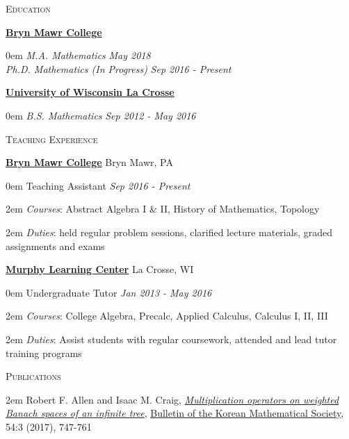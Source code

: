 \documentclass[11pt]{article}
\newenvironment{headitem}[2]{\vskip5pt \hspace{.5em} \textbf{#1} \hfill #2 \begin{addmargin}[0em]{0em}}{\end{addmargin}}
\renewenvironment{section}[1]{\textsc{\large #1}}{\vskip10pt}
\newcommand{\itemreg}[1]{\begin{addmargin}[.75em]{2em} #1 \end{addmargin}}
\newcommand{\itemdate}[2]{\hspace{.5em} #1 \hfill \textit{#2} \\}
\newcommand{\itemitdate}[2]{\hspace{.5em} \textit{#1} \hfill \textit{#2} \\}
\begin{document}
\null
\vskip20pt



\begin{section}{Education}

	\begin{headitem}{\href{https://www.brynmawr.edu/math/}{Bryn Mawr College}}{}
		\itemitdate{M.A. Mathematics}{May 2018}
		\itemitdate{Ph.D. Mathematics (In Progress)}{Sep 2016 - Present}
	\end{headitem}
	
	\begin{headitem}{\href{https://www.uwlax.edu/mathematics/}{University of Wisconsin La Crosse}}{}
		\itemitdate{B.S. Mathematics}{Sep 2012 - May 2016}
	\end{headitem}
	
\end{section}



\begin{section}{Teaching Experience}
	
	\begin{headitem}{\href{https://www.brynmawr.edu/math/}{Bryn Mawr College}}{Bryn Mawr, PA}
		\itemdate{Teaching Assistant}{Sep 2016 - Present}
		\itemreg{\textit{Courses}: Abstract Algebra I \& II, History of Mathematics, Topology}
		\itemreg{\textit{Duties}: held regular problem sessions, clarified lecture materials, graded assignments and exams}
	\end{headitem}
	
	\begin{headitem}{\href{https://www.uwlax.edu/murphy-learning-center/}{Murphy Learning Center}}{La Crosse, WI}
		\itemdate{Undergraduate Tutor}{Jan 2013 - May 2016}
		\itemreg{\textit{Courses}: College Algebra, Precalc, Applied Calculus, Calculus I, II, III}
		\itemreg{\textit{Duties}: Assist students with regular coursework, attended and lead tutor training programs}
	\end{headitem}

\end{section}



\begin{section}{Publications}\vskip5pt
	\itemreg{Robert F. Allen and Isaac M. Craig, \textit{\href{{http://bkms.kms.or.kr/journal/view.html?multi\%5B\%5D=7656\&tops=\&book=BKMS\&start=0\&scale=50\&authkey=\&keykey=\&key_1=\&titlekey=\&tit_1=\&abskey=\&abs_1=\&msckey=\&msc_1=\&Vol=54\&Num=3\&PG=\&year1=\&year2=\&sort=Regnum-0\&aut_box=Y\&sub_box=Y\&sos_box=\&key_box=\&pub_box=Y\&abs_box=\&mod=vol\&sflag=\&language=\&uid=}}{Multiplication operators on weighted Banach spaces of an infinite tree}}, \href{http://bkms.kms.or.kr/}{Bulletin of the Korean Mathematical Society}, 54:3 (2017), 747-761}
\end{section}
\end{document}
